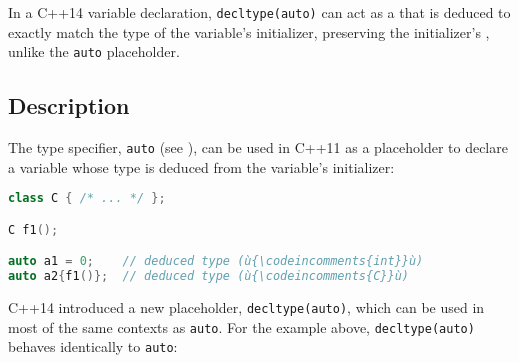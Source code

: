 




\label{deducing-types-using-decltype-semantics}
\setcounter{table}{0}
\setcounter{footnote}{0}
\setcounter{lstlisting}{0}


In a C++14 variable declaration, \lstinline!decltype(auto)! can act as a
 that is deduced to exactly match the type of
the variable's initializer, preserving the initializer's , unlike the \lstinline!auto! placeholder.

\subsection[Description]{Description}\label{description}

The type specifier, \lstinline!auto! (see ),
can be used in C++11 as a placeholder to declare a variable whose type
is deduced from the variable's initializer:

\begin{lstlisting}[language=C++]
class C { /* ... */ };

C f1();

auto a1 = 0;    // deduced type (ù{\codeincomments{int}}ù)
auto a2{f1()};  // deduced type (ù{\codeincomments{C}}ù)
\end{lstlisting}
    

C++14 introduced a new placeholder, \lstinline!decltype(auto)!, which can
be used in most of the same contexts as \lstinline!auto!. For the example
above, \lstinline!decltype(auto)! behaves identically to \lstinline!auto!:

